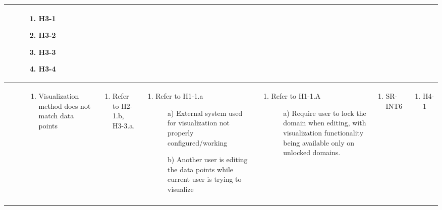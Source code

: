 \documentclass{article}
\begin{document}
\begin{landscape}
\begin{longtable}{|p{2cm}|p{4cm}|p{4cm}|p{4cm}|p{4cm}|p{2cm}|p{2cm}|}
\begin{enumerate}[leftmargin=*]
  \end{enumerate} &
  \begin{enumerate}[leftmargin=*]
    \item H3-1
    \item H3-2
    \item H3-3
    \item H3-4
  \end{enumerate} \\
  \hline
   &
  \begin{enumerate}[leftmargin=*]
      \item Visualization method does not match data points
  \end{enumerate} &
  \begin{enumerate}[leftmargin=*]
      \item Refer to H2-1.b, H3-3.a.
  \end{enumerate} &
  \begin{enumerate}[leftmargin=*]
    \item Refer to H1-1.a
    \begin{enumerate}
        \item[a)] External system used for visualization not properly configured/working
        \item[b)] Another user is editing the data points while current user is trying to visualize
    \end{enumerate}
  \end{enumerate} &
  \begin{enumerate}[leftmargin=*]
    \item Refer to H1-1.A
    \begin{enumerate}
        \item[a)] Require user to lock the domain when editing, with visualization functionality being available only on unlocked domains.
    \end{enumerate}
  \end{enumerate} &
  \begin{enumerate}[leftmargin=*]
       \item SR-INT6
  \end{enumerate} &
  \begin{enumerate}[leftmargin=*]
       \item H4-1
  \end{enumerate} \\
  \hline
   &

\end{longtable}
\end{landscape}
\end{document}
